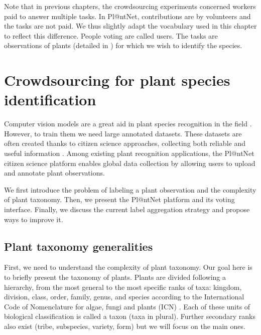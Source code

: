 Note that in previous chapters, the crowdsourcing experiments concerned workers paid to answer multiple tasks.
In Pl@ntNet, contributions are by volunteers and the tasks are not paid.
We thus slightly adapt the vocabulary used in this chapter to reflect this difference.
People voting are called users.
The tasks are observations of plants (detailed in ) for which we wish to identify the species.

\section{Crowdsourcing for plant species identification}
\label{sec:introducing_plantnet}

Computer vision models are a great aid in plant species recognition in the field \citep{vidal2021perspectives,borowiec2022}.
However, to train them we need large annotated datasets.
These datasets are often created thanks to citizen science approaches, collecting both reliable and useful information \citep{brown2019potential,wright2021pixelwise}.
Among existing plant recognition applications, the Pl@ntNet citizen science platform \citep{affouard2017pl} enables global data collection by allowing users to upload and annotate plant observations.

We first introduce the problem of labeling a plant observation and the complexity of plant taxonomy. Then, we present the Pl@ntNet platform and its voting interface.
Finally, we discuss the current label aggregation strategy and propose ways to improve it.

\subsection{Plant taxonomy generalities}
First, we need to understand the complexity of plant taxonomy.
Our goal here is to briefly present the taxonomy of plants.
Plants are divided following a hierarchy, from the most general to the most specific ranks of taxa: kingdom, division, class, order, family, genus, and species according to the International Code of Nomenclature for algae, fungi and plants (ICN) \citep{turland2018international}.
Each of these units of biological classification is called a taxon (taxa in plural).
Further secondary ranks also exist (tribe, subspecies, variety, form) but we will focus on the main ones.


